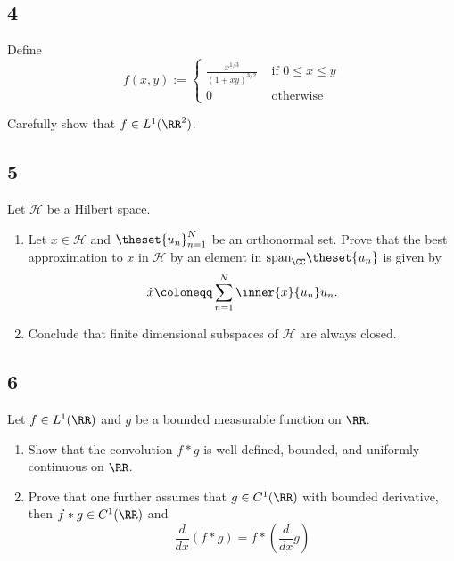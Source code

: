 \hypertarget{section-3}{%
\subsection{4}\label{section-3}}

Define \[
f(x, y):=\left\{\begin{array}{ll}{\frac{x^{1 / 3}}{(1+x y)^{3 / 2}}} & {\text { if } 0 \leq x \leq y} \\ {0} & {\text { otherwise }}\end{array}\right.
\]

Carefully show that \(f \in L^1(\RR^2)\).

\hypertarget{section-4}{%
\subsection{5}\label{section-4}}

Let \(\mathcal H\) be a Hilbert space.

\begin{enumerate}
\def\labelenumi{\arabic{enumi}.}
\tightlist
\item
  Let \(x\in \mathcal H\) and \(\theset{u_n}_{n=1}^N\) be an orthonormal
  set. Prove that the best approximation to \(x\) in \(\mathcal H\) by
  an element in \(\mathrm{span}_\CC\theset{u_n}\) is given by \[
    \hat x \coloneqq \sum_{n=1}^N \inner{x}{u_n}u_n.
    \]
\item
  Conclude that finite dimensional subspaces of \(\mathcal H\) are
  always closed.
\end{enumerate}

\hypertarget{section-5}{%
\subsection{6}\label{section-5}}

Let \(f \in L^1(\RR)\) and \(g\) be a bounded measurable function on
\(\RR\).

\begin{enumerate}
\def\labelenumi{\arabic{enumi}.}
\tightlist
\item
  Show that the convolution \(f\ast g\) is well-defined, bounded, and
  uniformly continuous on \(\RR\).
\item
  Prove that one further assumes that \(g \in C^1(\RR)\) with bounded
  derivative, then \(f\ast g \in C^1(\RR)\) and \[
  \frac{d}{d x}(f * g)=f *\left(\frac{d}{d x} g\right)
  \]
\end{enumerate}

